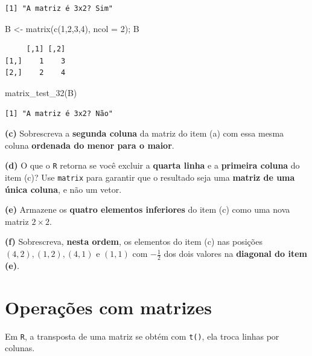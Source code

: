 \documentclass[
  letterpaper,
  DIV=11,
  numbers=noendperiod]{scrreprt}
\newenvironment{Shaded}{\begin{snugshade}}{\end{snugshade}}
\newcommand{\AttributeTok}[1]{\textcolor[rgb]{0.40,0.45,0.13}{#1}}
\newcommand{\DecValTok}[1]{\textcolor[rgb]{0.68,0.00,0.00}{#1}}
\newcommand{\FunctionTok}[1]{\textcolor[rgb]{0.28,0.35,0.67}{#1}}
\newcommand{\NormalTok}[1]{\textcolor[rgb]{0.00,0.23,0.31}{#1}}
\newcommand{\OtherTok}[1]{\textcolor[rgb]{0.00,0.23,0.31}{#1}}
\begin{document}
\begin{verbatim}
[1] "A matriz é 3x2? Sim"
\end{verbatim}

\begin{Shaded}
\begin{Highlighting}[]
\NormalTok{B }\OtherTok{\textless{}{-}} \FunctionTok{matrix}\NormalTok{(}\FunctionTok{c}\NormalTok{(}\DecValTok{1}\NormalTok{,}\DecValTok{2}\NormalTok{,}\DecValTok{3}\NormalTok{,}\DecValTok{4}\NormalTok{), }\AttributeTok{ncol =} \DecValTok{2}\NormalTok{); B}
\end{Highlighting}
\end{Shaded}

\begin{verbatim}
     [,1] [,2]
[1,]    1    3
[2,]    2    4
\end{verbatim}

\begin{Shaded}
\begin{Highlighting}[]
\FunctionTok{matrix\_test\_32}\NormalTok{(B)}
\end{Highlighting}
\end{Shaded}

\begin{verbatim}
[1] "A matriz é 3x2? Não"
\end{verbatim}

\textbf{(c)} Sobrescreva a \textbf{segunda coluna} da matriz do item (a)
com essa mesma coluna \textbf{ordenada do menor para o maior}.

\textbf{(d)} O que o \texttt{R} retorna se você excluir a \textbf{quarta
linha} e a \textbf{primeira coluna} do item (c)? Use \texttt{matrix}
para garantir que o resultado seja uma \textbf{matriz de uma única
coluna}, e não um vetor.

\textbf{(e)} Armazene os \textbf{quatro elementos inferiores} do item
(c) como uma nova matriz \(2 \times 2\).

\textbf{(f)} Sobrescreva, \textbf{nesta ordem}, os elementos do item (c)
nas posições \((4, 2), (1, 2), (4, 1)\) e \((1, 1)\) com
\(-\tfrac{1}{2}\) dos dois valores na \textbf{diagonal do item (e)}.

\section{Operações com matrizes}\label{operauxe7uxf5es-com-matrizes}

Em \texttt{R}, a transposta de uma matriz se obtém com \texttt{t()}, ela
troca linhas por colunas.
\end{document}
